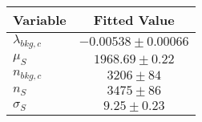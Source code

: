 \begin{tabular}[t]{lc}
\hline
Variable &Fitted Value\\
\hline\hline
$\lambda_{bkg,c}$&$-0.00538\pm0.00066$\\
\hline
$\mu_{S}$&$1968.69\pm0.22$\\
\hline
$n_{bkg,c}$&$3206\pm84$\\
\hline
$n_{S}$&$3475\pm86$\\
\hline
$\sigma_{S}$&$9.25\pm0.23$\\
\hline
\end{tabular}